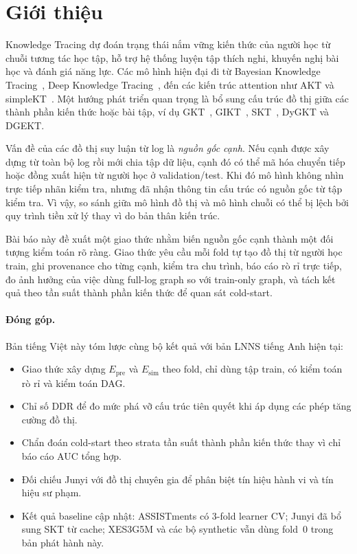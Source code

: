 \documentclass[runningheads]{llncs}
\newcommand{\Epre}{\ensuremath{E_{\text{pre}}}}
\newcommand{\Esim}{\ensuremath{E_{\text{sim}}}}
\newcommand{\KC}{thành phần kiến thức}
\newcommand{\KCs}{thành phần kiến thức}
\newcommand{\DDR}{\textsc{DDR}}
\begin{document}
\section{Giới thiệu}
Knowledge Tracing dự đoán trạng thái nắm vững kiến thức của người học từ chuỗi tương tác học tập, hỗ trợ hệ thống luyện tập thích nghi, khuyến nghị bài học và đánh giá năng lực. Các mô hình hiện đại đi từ Bayesian Knowledge Tracing~\cite{corbett1995bkt}, Deep Knowledge Tracing~\cite{piech2015dkt}, đến các kiến trúc attention như AKT và simpleKT~\cite{ghosh2020akt,liu2023simplekt}. Một hướng phát triển quan trọng là bổ sung cấu trúc đồ thị giữa các \KCs{} hoặc bài tập, ví dụ GKT~\cite{nakagawa2019gkt}, GIKT~\cite{yang2021gikt}, SKT~\cite{tong2020skt}, DyGKT và DGEKT.

Vấn đề của các đồ thị suy luận từ log là \emph{nguồn gốc cạnh}. Nếu cạnh được xây dựng từ toàn bộ log rồi mới chia tập dữ liệu, cạnh đó có thể mã hóa chuyển tiếp hoặc đồng xuất hiện từ người học ở validation/test. Khi đó mô hình không nhìn trực tiếp nhãn kiểm tra, nhưng đã nhận thông tin cấu trúc có nguồn gốc từ tập kiểm tra. Vì vậy, so sánh giữa mô hình đồ thị và mô hình chuỗi có thể bị lệch bởi quy trình tiền xử lý thay vì do bản thân kiến trúc.

Bài báo này đề xuất một giao thức nhằm biến nguồn gốc cạnh thành một đối tượng kiểm toán rõ ràng. Giao thức yêu cầu mỗi fold tự tạo đồ thị từ người học train, ghi provenance cho từng cạnh, kiểm tra chu trình, báo cáo rò rỉ trực tiếp, đo ảnh hưởng của việc dùng full-log graph so với train-only graph, và tách kết quả theo tần suất \KC{} để quan sát cold-start.

\paragraph{Đóng góp.}
Bản tiếng Việt này tóm lược cùng bộ kết quả với bản LNNS tiếng Anh hiện tại:
\begin{itemize}
  \item Giao thức xây dựng \Epre{} và \Esim{} theo fold, chỉ dùng tập train, có kiểm toán rò rỉ và kiểm toán DAG.
  \item Chỉ số \DDR{} để đo mức phá vỡ cấu trúc tiên quyết khi áp dụng các phép tăng cường đồ thị.
  \item Chẩn đoán cold-start theo strata tần suất \KC{} thay vì chỉ báo cáo AUC tổng hợp.
  \item Đối chiếu Junyi với đồ thị chuyên gia để phân biệt tín hiệu hành vi và tín hiệu sư phạm.
  \item Kết quả baseline cập nhật: ASSISTments có 3-fold learner CV; Junyi đã bổ sung SKT từ cache; XES3G5M và các bộ synthetic vẫn dùng fold~0 trong bản phát hành này.
\end{itemize}
\end{document}
